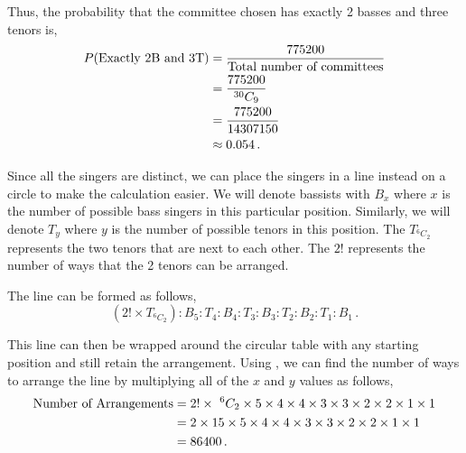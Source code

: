 \begin{subquestions}
\begin{subsubquestions}
Thus, the probability that the committee chosen has exactly 2 basses and three tenors is,
\begin{align}
	P(\text{Exactly 2B and 3T}) & = \frac{775200}{\text{Total number of committees}} \nonumber \\
	                            & = \frac{775200}{^{30}C_9} \nonumber \\
	                            & = \frac{775200}{14307150} \nonumber \\
	                            & \approx 0.054 \,.
\end{align}


\subsubquestion 

Since all the singers are distinct, we can place the singers in a line instead on a circle to make the calculation easier. We will denote bassists with $B_x$ where $x$ is the number of possible bass singers in this particular position. Similarly, we will denote $T_y$ where $y$ is the number of possible tenors in this position. The $T_{^6C_2}$ represents the two tenors that are next to each other. The $2!$ represents the number of ways that the 2 tenors can be arranged.

The line can be formed as follows,
\begin{equation}
	(2! \times T_{^6C_2}):B_5: T_4: B_4: T_3: B_3: T_2: B_2: T_1: B_1 \,.
\end{equation}

This line can then be wrapped around the circular table with any starting position and still retain the arrangement. Using , we can find the number of ways to arrange the line by multiplying all of the $x$ and $y$ values as follows,
\begin{align}
	\text{Number of Arrangements} & = 2! \times ~^6C_2 \times 5\times 4\times 4\times 3\times 3\times 2\times 2\times 1\times 1 \nonumber \\
	                       & = 2 \times 15 \times 5\times 4\times 4\times 3\times 3\times 2\times 2\times 1\times 1 \nonumber \\
	                       & = 86400 \,.
\end{align}


\end{subsubquestions}
	
	
	
\end{subquestions}